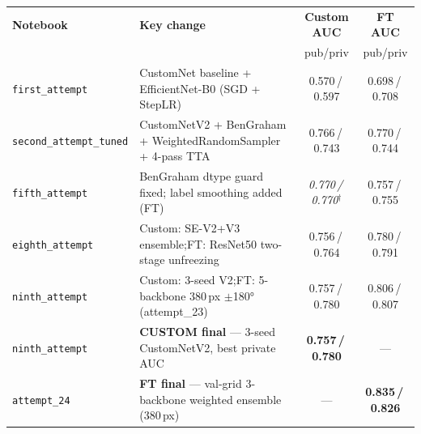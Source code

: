 \documentclass[a4paper, 10pt, twocolumn]{article}
\begin{document}
\label{tab:traj}
\vspace{3pt}
\footnotesize
\setlength{\tabcolsep}{5pt}
\renewcommand{\arraystretch}{1.12}
\begin{tabularx}{\textwidth}{@{}l X cc@{}}
\toprule
\textbf{Notebook} & \textbf{Key change} &
  \textbf{Custom AUC} & \textbf{FT AUC} \\
 & & \scriptsize pub\;/\;priv & \scriptsize pub\;/\;priv \\
\midrule
\texttt{first\_attempt}
  & CustomNet baseline + EfficientNet-B0 (SGD + StepLR)
  & 0.570\,/\,0.597 & 0.698\,/\,0.708 \\
\texttt{second\_attempt\_tuned}
  & CustomNetV2 + BenGraham + WeightedRandomSampler + 4-pass TTA
  & 0.766\,/\,0.743 & 0.770\,/\,0.744 \\
\texttt{fifth\_attempt}
  & BenGraham dtype guard fixed; label smoothing added (FT)
  & \textit{0.770\,/\,0.770}$^\dagger$ & 0.757\,/\,0.755 \\
\texttt{eighth\_attempt}
  & Custom: SE-V2+V3 ensemble;\enspace FT: ResNet50 two-stage unfreezing
  & 0.756\,/\,0.764 & 0.780\,/\,0.791 \\
\texttt{ninth\_attempt}
  & Custom: 3-seed V2;\enspace FT: 5-backbone 380\,px $\pm$180° (attempt\_23)
  & 0.757\,/\,0.780 & 0.806\,/\,0.807 \\
\rowcolor{rowbest}
\texttt{ninth\_attempt}
  & \textbf{CUSTOM final} --- 3-seed CustomNetV2, best private AUC
  & \textbf{0.757\,/\,0.780} & --- \\
\rowcolor{rowbest}
\texttt{attempt\_24}
  & \textbf{FT final} --- val-grid 3-backbone weighted ensemble (380\,px)
  & --- & \textbf{0.835\,/\,0.826} \\
\bottomrule
\end{tabularx}

\vspace{10pt}
\end{document}
